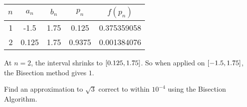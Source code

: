 \documentclass[../../Assignments.tex]{subfiles}
\begin{document}
\begin{solution}
\begin{enumerate}[label = (\alph*)]
            \begin{table}[H]
                \centering
                \begin{tabular}{r S[table-format=-1.3] S[table-format=1.2] S[table-format=1.4] S[table-format=1.9]}
                    \toprule
                    \(n\)  &   {\(a_n\)}   &   {\(b_n\)}   &   {\(p_n\)}   &  {\(f(p_n)\)}  \\
                      &  -1.5         & 1.75          &  0.125        &  0.375359058   \\
                        2  &   0.125       & 1.75          &  0.9375       &  0.001384076   \\
                    \bottomrule
                \end{tabular}
            \end{table}

            At \(n = 2\), the interval shrinks to
            \(\interval{\num{0.125}}{\num{1.75}}\). So when applied on
            \(\interval{\num{-1.5}}{\num{1.75}}\), the Bisection method gives
            \(1\).
    \end{enumerate}
\end{solution}

\begin{exercise}
    Find an approximation to \(\sqrt{3}\) correct to within \(10^{−4}\) using
    the Bisection Algorithm.
\end{exercise}
\end{document}
